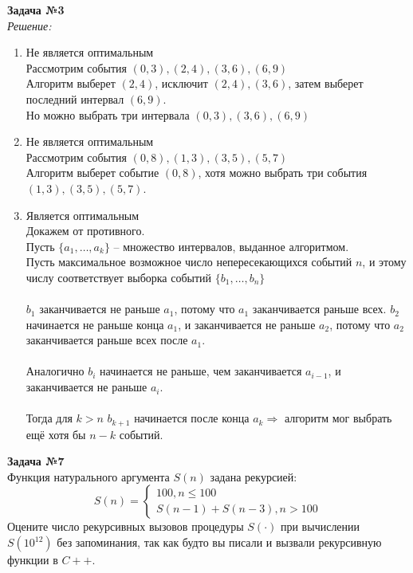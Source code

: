 \documentclass[11pt]{article}
\begin{document}
\textbf{Задача №3}
	\\

{\itshape Решение:}
\\
\begin{enumerate}
	\item Не является оптимальным
	\\
	Рассмотрим события $(0,3),(2,4),(3,6),(6,9)$ \\
	Алгоритм выберет $(2,4)$, исключит $(2,4),(3,6)$, затем выберет последний интервал $(6,9)$. \\
	Но можно выбрать три интервала $(0,3),(3,6),(6,9)$
	\item Не является оптимальным
	\\
	Рассмотрим события $(0,8),(1,3),(3,5),(5,7)$ \\
	Алгоритм выберет событие $(0,8)$, хотя можно выбрать три события $(1,3),(3,5),(5,7)$.
	\item Является оптимальным\\
	Докажем от противного.\\
	Пусть $\{a_1,\dots,a_k\}$ -- множество интервалов, выданное алгоритмом. \\
	Пусть максимальное возможное число непересекающихся событий $n$, и этому числу соответствует выборка событий $\{b_1,\dots,b_n\}$\\\\
	$b_1$ заканчивается не раньше $a_1$, потому что $a_1$ заканчивается раньше всех. $b_2$ начинается не раньше конца $a_1$, и заканчивается не раньше $a_2$, потому что $a_2$ заканчивается раньше всех после $a_1$. \\\\
	Аналогично $b_i$ начинается не раньше, чем заканчивается $a_{i-1}$, и заканчивается не раньше $a_i$.
	\\\\
	Тогда для $k>n$ $b_{k+1}$ начинается после конца $a_k \Rightarrow$ алгоритм мог выбрать ещё хотя бы $n-k$ событий.
\end{enumerate}

\textbf{Задача №7}
\\
Функция натурального аргумента $S(n)$ задана рекурсией:
	\[S(n) = \begin{cases}
		100, n\le100\\
		S(n-1) + S(n-3), n>100
   \end{cases}
    \]
   Оцените число рекурсивных вызовов процедуры $S(\cdot)$ при вычислении $S(10^{12})$ без запоминания, так как будто вы писали и вызвали рекурсивную функции в $C++$.
   	\\
   
\end{document}
